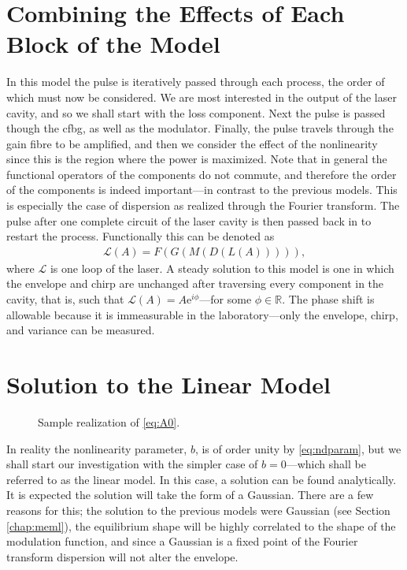 \section{Combining the Effects of Each Block of the Model}
\label{sec:effects}
In this model the pulse is iteratively passed through each process, the order of which must now be considered. We are most interested in the output of the laser cavity, and so we shall start with the loss component. Next the pulse is passed though the \gls{cfbg}, as well as the modulator. Finally, the pulse travels through the gain fibre to be amplified, and then we consider the effect of the nonlinearity since this is the region where the power is maximized. Note that in general the functional operators of the components do not commute, and therefore the order of the components is indeed important---in contrast to the previous models. This is especially the case of dispersion as realized through the Fourier transform. The pulse after one complete circuit of the laser cavity is then passed back in to restart the process. Functionally this can be denoted as
\begin{align}
	\mathcal{L}(A) = F(G(M(D(L(A))))),
\end{align}
where $\mathcal{L}$ is one loop of the laser. A steady solution to this model is one in which the envelope and chirp are unchanged after traversing every component in the cavity, that is, such that $\mathcal{L}(A) = A \textrm{e}^{i \phi}$---for some $\phi \in \mathbb{R}$. The phase shift is allowable because it is immeasurable in the laboratory---only the envelope, chirp, and variance can be measured.

\section{Solution to the Linear Model}
\label{sec:linear}
\begin{figure}[tbp]
\centering

\caption{Sample realization of \eqref{eq:A0}.}
\label{fig:samplegauss}
\end{figure}
In reality the nonlinearity parameter, $b$, is of order unity by \eqref{eq:ndparam}, but we shall start our investigation with the simpler case of $b = 0$---which shall be referred to as the linear model. In this case, a solution can be found analytically. It is expected the solution will take the form of a Gaussian. There are a few reasons for this; the solution to the previous models were Gaussian \cite{cutler, siegman, kuizenga1970a, martinez1984, martinez1985} (see Section \ref{chap:meml}), the equilibrium shape will be highly correlated to the shape of the modulation function, and since a Gaussian is a fixed point of the Fourier transform \cite{gradshteyn} dispersion will not alter the envelope. \\

